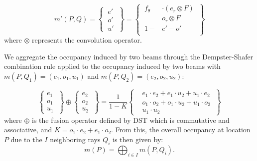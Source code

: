 \begin{equation}
 m'(P,Q)=\left\{\  \begin{aligned}
                 e'\\o'\\u'
                 \end{aligned}
\  \right\} = \left\{\  \begin{aligned}
                     f_\theta  &\cdot (e_r \otimes F)\\
                     &o_r \otimes F\\
                     1 - &e' - o'\\ 
                    \end{aligned}
\ \right\}
\end{equation}
where $\otimes$ represents the convolution operator.

We  aggregate the occupancy induced by two beams through the Dempster-Shafer combination rule applied to the occupancy induced by two beams with $m(P,Q_1)=(e_1, o_1, u_1)$ and $m(P,Q_2)=(e_2, o_2, u_2)$:

\begin{equation}
  \left\{ \begin{aligned}
                 e_1\  \\o_1\  \\u_1\ 
                \end{aligned}
 \right\} \oplus \left\{ \begin{aligned}
                     e_2\ \\o_2\ \\u_2\  
                    \end{aligned}
\right\} = \frac{1}{1-K} 
\left\{ 
  \begin{aligned}
     &e_1\cdot e_2 + e_1\cdot u_2 + u_1\cdot e_2 \ \\
     &o_1\cdot o_2 + o_1\cdot u_2 + u_1\cdot o_2 \ \\
     &u_1\cdot u_2 \ 
  \end{aligned}
 \right\}
\end{equation}
where $\oplus$ is the fusion operator defined by DST which is commutative and associative, and $K = o_1\cdot e_2 + e_1\cdot o_2$.
From this, the overall occupancy at location $P$ due to the $I$ neighboring rays $Q_i$ is then given by:
\begin{equation}
 m(P) = \bigoplus_{i\in I} m(P,Q_i).
\end{equation}

